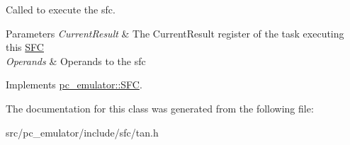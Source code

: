 Called to execute the sfc. 


\begin{DoxyParams}{Parameters}
{\em Current\+Result} & The Current\+Result register of the task executing this \hyperlink{classpc__emulator_1_1SFC}{S\+FC} \\
\hline
{\em Operands} & Operands to the sfc \\
\hline
\end{DoxyParams}


Implements \hyperlink{classpc__emulator_1_1SFC_ab206c80fc0e429c56672b4f6a0ca8635}{pc\+\_\+emulator\+::\+S\+FC}.



The documentation for this class was generated from the following file\+:\begin{DoxyCompactItemize}
\item 
src/pc\+\_\+emulator/include/sfc/tan.\+h\end{DoxyCompactItemize}
